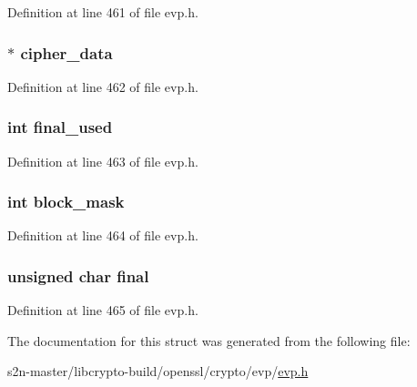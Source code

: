 Definition at line 461 of file evp.\+h.

\subsubsection[{\texorpdfstring{cipher\+\_\+data}{cipher_data}}]{ $\ast$ cipher\+\_\+data}\hypertarget{structevp__cipher__ctx__st_a35f838b2c27071fbcfd6d602e7c6db0a}{}\label{structevp__cipher__ctx__st_a35f838b2c27071fbcfd6d602e7c6db0a}


Definition at line 462 of file evp.\+h.

\subsubsection[{\texorpdfstring{final\+\_\+used}{final_used}}]{\setlength{\rightskip}{0pt plus 5cm}int final\+\_\+used}\hypertarget{structevp__cipher__ctx__st_af268b4c552dc1562d600ffbf165831b5}{}\label{structevp__cipher__ctx__st_af268b4c552dc1562d600ffbf165831b5}


Definition at line 463 of file evp.\+h.

\subsubsection[{\texorpdfstring{block\+\_\+mask}{block_mask}}]{\setlength{\rightskip}{0pt plus 5cm}int block\+\_\+mask}\hypertarget{structevp__cipher__ctx__st_a8b51580dfc3aa0a83b1193699be06e84}{}\label{structevp__cipher__ctx__st_a8b51580dfc3aa0a83b1193699be06e84}


Definition at line 464 of file evp.\+h.

\subsubsection[{\texorpdfstring{final}{final}}]{\setlength{\rightskip}{0pt plus 5cm}unsigned char final}\hypertarget{structevp__cipher__ctx__st_a0759886f796a986ba825948ced1ece1e}{}\label{structevp__cipher__ctx__st_a0759886f796a986ba825948ced1ece1e}


Definition at line 465 of file evp.\+h.



The documentation for this struct was generated from the following file\+:\begin{DoxyCompactItemize}
\item 
s2n-\/master/libcrypto-\/build/openssl/crypto/evp/\hyperlink{crypto_2evp_2evp_8h}{evp.\+h}\end{DoxyCompactItemize}
